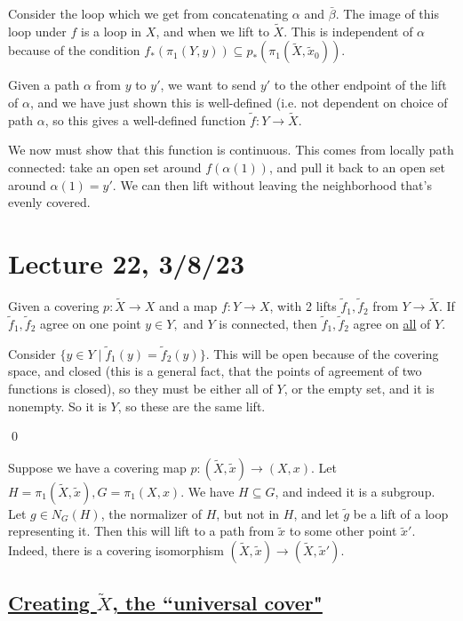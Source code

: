\documentclass[x11names,reqno,14pt]{extarticle}
\begin{document}
Consider the loop which we get from concatenating $\alpha$ and $\bar{\beta}$. The image of this loop under $f$ is a loop in $X$, and when we lift to $\tilde{X}$. This is independent of $\alpha$ because of the condition $f_*(\pi_1(Y, y)) \subseteq p_*(\pi_1(\tilde{X},\tilde{x}_0))$. 

Given a path $\alpha$ from $y$ to $y'$, we want to send $y'$ to the other endpoint of the lift of $\alpha$, and we have just shown this is well-defined (i.e. not dependent on choice of path $\alpha$, so this gives a well-defined function $\tilde{f}:Y\to \tilde{X}$. 

We now must show that this function is continuous. This comes from locally path connected: take an open set around $f(\alpha(1))$, and pull it back to an open set around $\alpha(1) = y'$. We can then lift without leaving the neighborhood that's evenly covered. 

\section*{Lecture 22, 3/8/23}

\prop

Given a covering $p:\tilde{X}\to X$ and a map $f:Y\to X$, with 2 lifts $\tilde{f}_1,\tilde{f}_2$ from $Y \to \tilde{X}$. If $\tilde{f}_1,\tilde{f}_2$ agree on one point $y\in Y,$ and $Y$ is connected, then $\tilde{f}_1,\tilde{f}_2$ agree on \underline{all} of $Y$.

\proof

Consider $\{y\in Y \mid \tilde{f}_1(y) = \tilde{f}_2(y)\}$. This will be open because of the covering space, and closed (this is a general fact, that the points of agreement of two functions is closed), so they must be either all of $Y$, or the empty set, and it is nonempty. So it is $Y$, so these are the same lift. 

\qed

Suppose we have a covering map $p:(\tilde{X},\tilde{x})\to(X, x)$. Let $H = \pi_1(\tilde{X},\tilde{x}), G = \pi_1(X, x)$. We have $H \subseteq G$, and indeed it is a subgroup. Let $g \in N_G(H)$, the normalizer of $H$, but not in $H$, and let $\tilde{g}$ be a lift of a loop representing it. Then this will lift to a path from $\tilde{x}$ to some other point $\tilde{x}'$. Indeed, there is a covering isomorphism $(\tilde{X},\tilde{x}) \to (\tilde{X},\tilde{x}')$. 

\subsection*{\underline{Creating $\tilde{X}$, the ``universal cover"}}
\end{document}
